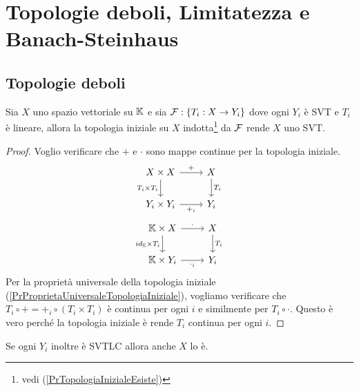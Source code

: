 \chapter{Topologie deboli, Limitatezza e Banach-Steinhaus}

\section{Topologie deboli}

\begin{proposition}\label{PrTopologiaInizialeCasoSVT}
Sia $X$ uno spazio vettoriale su $\mathbb{K}$ e sia $\mathcal{F}:\left\{{T_i:X\to Y_i}\right\}$ dove ogni $Y_i$ \`e SVT e $T_i$ \`e lineare, allora la topologia iniziale su $X$ indotta\footnote{vedi (\ref{PrTopologiaInizialeEsiste})} da $\mathcal{F}$ rende $X$ uno SVT.
\end{proposition}
\begin{proof}
Voglio verificare che $+$ e $\cdot$ sono mappe continue per la topologia iniziale.
\[\begin{tikzcd}
	{X\times X} & X \\
	{Y_i\times Y_i} & {Y_i}
	\arrow["{+}", from=1-1, to=1-2]
	\arrow["{T_i\times T_i}"', from=1-1, to=2-1]
	\arrow["{T_i}", from=1-2, to=2-2]
	\arrow["{+_i}"', from=2-1, to=2-2]
\end{tikzcd}\]
\[\begin{tikzcd}
	{\K\times X} & X \\
	{\K\times Y_i} & {Y_i}
	\arrow["\cdot", from=1-1, to=1-2]
	\arrow["{id_\K\times T_i}"', from=1-1, to=2-1]
	\arrow["{T_i}", from=1-2, to=2-2]
	\arrow["{\cdot_i}"', from=2-1, to=2-2]
\end{tikzcd}\]
Per la propriet\`a universale della topologia iniziale (\ref{PrProprietaUniversaleTopologiaIniziale}), vogliamo verificare che $T_i\circ +=+_i\circ (T_i\times T_i)$ \`e continua per ogni $i$ e similmente per $T_i\circ \cdot$. Questo \`e vero perch\'e la topologia iniziale \`e rende $T_i$ continua per ogni $i$.
\end{proof}

\begin{remark}
Se ogni $Y_i$ inoltre \`e SVTLC allora anche $X$ lo \`e.
\end{remark}


